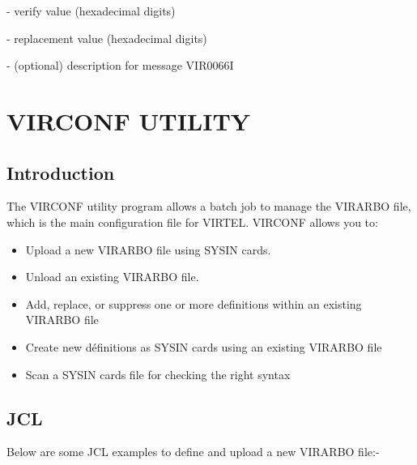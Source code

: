\documentclass[letterpaper,10pt,english]{sphinxmanual}
\begin{document}
 - verify value (hexadecimal digits)

 - replacement value (hexadecimal digits)

 - (optional) description for message VIR0066I

\ignorespaces 

\chapter{VIRCONF UTILITY}
\label{\detokenize{Installation_Guide:virconf-utility}}\label{\detokenize{Installation_Guide:index-151}}

\section{Introduction}
\label{\detokenize{Installation_Guide:id9}}
The VIRCONF utility program allows a batch job to manage the VIRARBO file, which is the main configuration file for VIRTEL. VIRCONF allows you to:
\begin{itemize}
\item {} 
Upload a new VIRARBO file using SYSIN cards.

\item {} 
Unload an existing VIRARBO file.

\item {} 
Add, replace, or suppress one or more definitions within an existing VIRARBO file

\item {} 
Create new définitions as SYSIN cards using an existing VIRARBO file

\item {} 
Scan a SYSIN cards file for checking the right syntax

\end{itemize}

\ignorespaces 

\section{JCL}
\label{\detokenize{Installation_Guide:jcl}}\label{\detokenize{Installation_Guide:index-152}}
Below are some JCL examples to define and upload a new VIRARBO file:-
\end{document}
